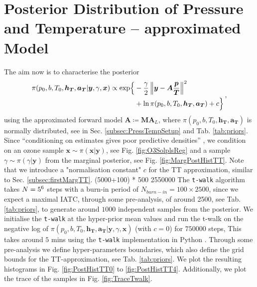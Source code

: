 \clearpage

\section{Posterior Distribution of Pressure and Temperature -- approximated Model}
\label{sec:postPT}

The aim now is to characterise the posterior
\begin{align}
	\begin{split}
		\pi(p_0,b,T_0,\bm{h_T},\bm{a_T} | \bm{y}, \gamma, \bm{x}) \propto  \exp\Bigl\{ & -\frac{\gamma}{2} \left\Vert \bm{y}- \bm{A} \frac{\bm{p}}{\bm{T}}  \right\Vert^2 \\ &+ \ln{\pi(p_0,b,T_0,\bm{h_T},\bm{a_T})  + c \Bigr\}  }
	\end{split} \, ,
	\label{eq:postPT}
\end{align}
using the approximated forward model $\bm{A} \coloneqq \bm{M}\bm{A}_L$, where $\pi(p_0,b,T_0,\bm{h_T},\bm{a_T})$ is normally distributed, see in Sec. \ref{subsec:PressTempSetup} and Tab. \ref{tab:priors}.
Since “conditioning on estimates gives poor predictive densities” \cite{tan2016LecNot}, we condition on an ozone sample $\bm{x} \sim \pi(\bm{x}|\bm{y})$, see Fig. \ref{fig:O3SolplsReg} and a sample $\gamma \sim \pi(\gamma| \bm{y})$ from the marginal posterior, see Fig. \ref{fig:MargPostHistTT}.
Note that we introduce a "normalisation constant" $c$ for the TT approximation, similar to Sec. \ref{subsec:firstMargTT}.
(5000+100) * 500
2550000
The \texttt{t-walk} \cite{christen2010general} algorithm takes $N = 5 \time 10^6$ steps with a burn-in period of $N_{burn-in} = 100 \times 2500 $, since we expect a maximal IATC, through some pre-analysis, of around 2500, see Tab. \ref{tab:priors}, to generate around $1000$ independent samples from the posterior.
We initialise the \texttt{t-walk} at the hyper-prior mean values and run the t-walk on the negative log of $\pi(p_0,b,T_0,\bm{h_T},\bm{a_T} | \bm{y}, \gamma, \bm{x}) $ (with $c=0$) for $750000$ steps,
This takes around $5$ mins using the \texttt{t-walk} implementation in Python \cite{christentwalkaccess}.
Through some pre-analysis we define hyper-parameters boundaries, which also define the grid bounds for the TT-approximation, see Tab. \ref{tab:priors}.
We plot the resulting histograms in Fig. \ref{fig:PostHistTT0} to \ref{fig:PostHistTT4}.
Additionally, we plot the trace of the samples in Fig. \ref{fig:TraceTwalk}.

